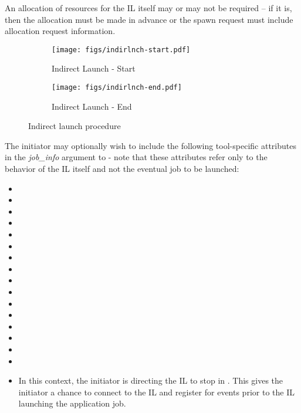 An allocation of resources for the \ac{IL} itself may or may not be required – if it is, then the allocation must be made in advance or the spawn request must include allocation request information.

\begin{figure*}[ht!]
\centering
\begin{subfigure}{.5\textwidth}
  \centering
  \texttt{[image: figs/indirlnch-start.pdf]}
  \caption{Indirect Launch - Start}
  \label{fig:indirlnch-start}
\end{subfigure}%
\begin{subfigure}{.5\textwidth}
  \centering
  \texttt{[image: figs/indirlnch-end.pdf]}
  \caption{Indirect Launch - End}
  \label{fig:indirlnch-end}
\end{subfigure}
\caption{Indirect launch procedure}
\label{fig:indirlnch}
\end{figure*}

The initiator may optionally wish to include the following tool-specific attributes in the \emph{job_info} argument to  - note that these attributes refer only to the behavior of the \ac{IL} itself and not the eventual job to be launched:

\begin{itemize}
    \item {}
    \item {}
    \item {}
    \item {}
    \item {}
    \item {}
    \item {}
    \item {}
    \item {}
    \item {}
    \item {}
    \item {}
    \item {}
    \item {}
    \item {}
    \item {}
    \item {}In this context, the initiator is directing the \ac{IL} to stop in . This gives the initiator a chance to connect to the \ac{IL} and register for events prior to the \ac{IL} launching the application job.
    \pasteAttributeItemEnd
\end{itemize}

